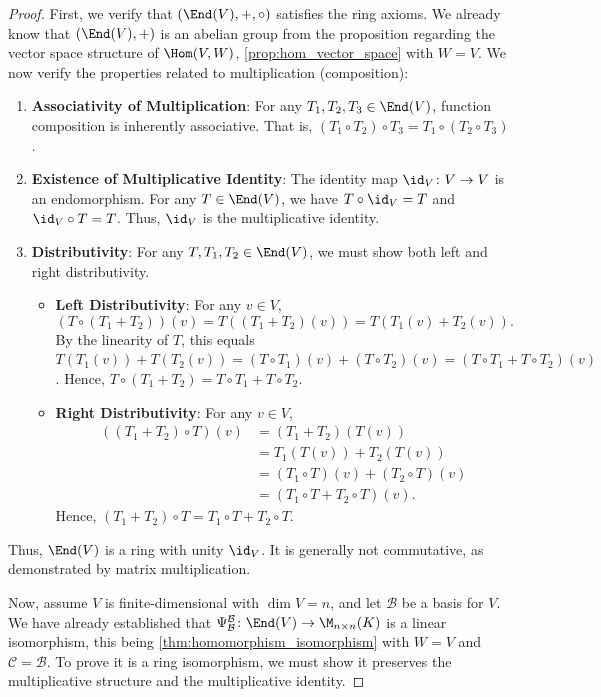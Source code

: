 \begin{proof}
  First, we verify that $(\End(V), +, \circ)$ satisfies the ring axioms. We already know that $(\End(V), +)$ is an abelian group from the proposition regarding the vector space structure of $\Hom(V,W)$, \cref{prop:hom_vector_space} with $W = V$. We now verify the properties related to multiplication (composition):
  \begin{enumerate}
    \item \textbf{Associativity of Multiplication}: For any $T_1, T_2, T_3 \in \End(V)$, function composition is inherently associative. That is, $(T_1 \circ T_2) \circ T_3 = T_1 \circ (T_2 \circ T_3)$.
    \item \textbf{Existence of Multiplicative Identity}: The identity map $\id_V \colon V \to V$ is an endomorphism. For any $T \in \End(V)$, we have $T \circ \id_V = T$ and $\id_V \circ T = T$. Thus, $\id_V$ is the multiplicative identity.
    \item \textbf{Distributivity}: For any $T, T_1, T_2 \in \End(V)$, we must show both left and right distributivity.
    \begin{itemize}
      \item \textbf{Left Distributivity}: For any $v \in V$,
      \[ (T \circ (T_1 + T_2))(v) = T((T_1 + T_2)(v)) = T(T_1(v) + T_2(v)). \]
      By the linearity of $T$, this equals $T(T_1(v)) + T(T_2(v)) = (T \circ T_1)(v) + (T \circ T_2)(v) = (T \circ T_1 + T \circ T_2)(v)$.
      Hence, $T \circ (T_1 + T_2) = T \circ T_1 + T \circ T_2$.
      \item \textbf{Right Distributivity}: For any $v \in V$,
      \begin{align*}
        ((T_1 + T_2) \circ T)(v) &= (T_1 + T_2)(T(v)) \\
        &= T_1(T(v)) + T_2(T(v)) \\
        &= (T_1 \circ T)(v) + (T_2 \circ T)(v) \\
        &= (T_1 \circ T + T_2 \circ T)(v).
      \end{align*}
      Hence, $(T_1 + T_2) \circ T = T_1 \circ T + T_2 \circ T$.
    \end{itemize}
  \end{enumerate}
  Thus, $\End(V)$ is a ring with unity $\id_V$. It is generally not commutative, as demonstrated by matrix multiplication.

  Now, assume $V$ is finite-di\-men\-sional with $\dim V = n$, and let $\mathcal{B}$ be a basis for $V$. We have already established that $\Psi_{\mathcal{B}}^{\mathcal{B}} \colon \End(V) \to \M_{n \times n}(K)$ is a linear isomorphism, this being \cref{thm:homomorphism_isomorphism} with $W = V$ and $\mathcal{C} = \mathcal{B}$. To prove it is a ring isomorphism, we must show it preserves the multiplicative structure and the multiplicative identity.


\end{proof}
